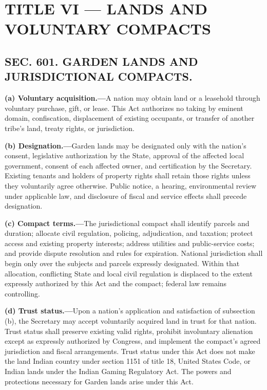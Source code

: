 \documentclass[12pt,letterpaper]{article}
\begin{document}
\section*{TITLE VI --- LANDS AND VOLUNTARY COMPACTS}

\subsection*{SEC. 601. GARDEN LANDS AND JURISDICTIONAL COMPACTS.}

\textbf{(a) Voluntary acquisition.---}A nation may obtain land or a leasehold through voluntary purchase, gift, or lease. This Act authorizes no taking by eminent domain, confiscation, displacement of existing occupants, or transfer of another tribe's land, treaty rights, or jurisdiction.

\textbf{(b) Designation.---}Garden lands may be designated only with the nation's consent, legislative authorization by the State, approval of the affected local government, consent of each affected owner, and certification by the Secretary. Existing tenants and holders of property rights shall retain those rights unless they voluntarily agree otherwise. Public notice, a hearing, environmental review under applicable law, and disclosure of fiscal and service effects shall precede designation.

\textbf{(c) Compact terms.---}The jurisdictional compact shall identify parcels and duration; allocate civil regulation, policing, adjudication, and taxation; protect access and existing property interests; address utilities and public-service costs; and provide dispute resolution and rules for expiration. National jurisdiction shall begin only over the subjects and parcels expressly designated. Within that allocation, conflicting State and local civil regulation is displaced to the extent expressly authorized by this Act and the compact; federal law remains controlling.

\textbf{(d) Trust status.---}Upon a nation's application and satisfaction of subsection (b), the Secretary may accept voluntarily acquired land in trust for that nation. Trust status shall preserve existing valid rights, prohibit involuntary alienation except as expressly authorized by Congress, and implement the compact's agreed jurisdiction and fiscal arrangements. Trust status under this Act does not make the land Indian country under section 1151 of title 18, United States Code, or Indian lands under the Indian Gaming Regulatory Act. The powers and protections necessary for Garden lands arise under this Act.
\end{document}

